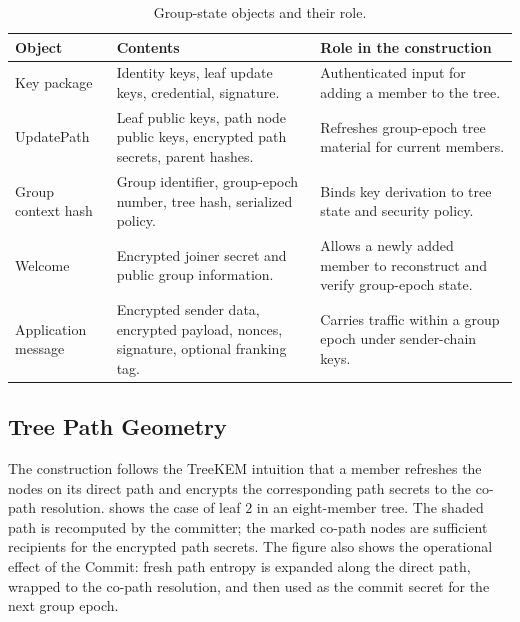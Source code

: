 \documentclass[preprint,12pt]{elsarticle}
\theoremstyle{definition}
\begin{document}
\begin{table}[H]
\centering
\caption{Group-state objects and their role.}\label{tab:objects}
\footnotesize
\begin{tabularx}{\textwidth}{@{}p{}YY@{}}
\toprule
Object & Contents & Role in the construction \\
\midrule
Key package & Identity keys, leaf update keys, credential, signature. & Authenticated input for adding a member to the tree. \\
UpdatePath & Leaf public keys, path node public keys, encrypted path secrets, parent hashes. & Refreshes group-epoch tree material for current members. \\
Group context hash & Group identifier, group-epoch number, tree hash, serialized policy. & Binds key derivation to tree state and security policy. \\
Welcome & Encrypted joiner secret and public group information. & Allows a newly added member to reconstruct and verify group-epoch state. \\
Application message & Encrypted sender data, encrypted payload, nonces, signature, optional franking tag. & Carries traffic within a group epoch under sender-chain keys. \\
\bottomrule
\end{tabularx}
\end{table}

\subsection{Tree Path Geometry}

The construction follows the TreeKEM intuition that a member refreshes the
nodes on its direct path and encrypts the corresponding path secrets to the
co-path resolution.  shows the case of leaf $2$ in an
eight-member tree. The shaded path is recomputed by the committer; the marked
co-path nodes are sufficient recipients for the encrypted path secrets. The
figure also shows the operational effect of the Commit: fresh path entropy is
expanded along the direct path, wrapped to the co-path resolution, and then
used as the commit secret for the next group epoch.
\end{document}
